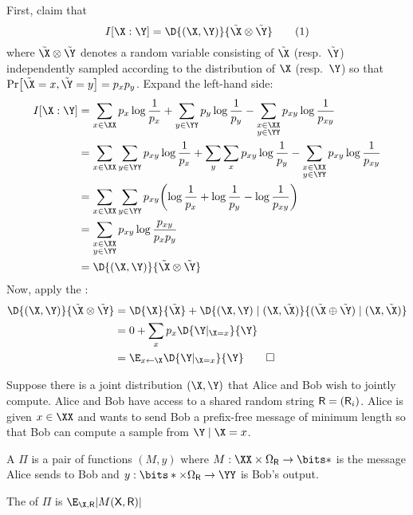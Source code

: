 \documentclass[class=co432,notes,tikz]{agony}
\begin{document}
\begin{prf}
  First, claim that
  \[
    I[\X : \Y] = \D{(\X,\Y)}{\tilde\X \otimes \tilde\Y}
    \nr{eq:claim1}
  \]
  where $\tilde\X \otimes \tilde\Y$ denotes a random variable consisting of
  $\tilde\X$ (resp.\ $\tilde\Y$) independently sampled
  according to the distribution of $\X$ (resp.\ $\Y$)
  so that $\Pr[\tilde\X=x,\tilde\Y=y]=p_x p_y$. Expand the left-hand side:
  \begin{align*}
    I[\X : \Y]
     & = \sum_{x\in\XX} p_x \log\frac1{p_x} + \sum_{y\in\YY} p_y \log\frac1{p_y} - \sum_{\substack{x\in\XX\br y\in\YY}}p_{xy}\log\frac1{p_{xy}}                   \\
     & = \sum_{x\in\XX}\sum_{y\in\YY} p_{xy} \log\frac1{p_x} + \sum_y\sum_x p_{xy} \log\frac1{p_y} - \sum_{\substack{x\in\XX\br y\in\YY}}p_{xy}\log\frac1{p_{xy}} \\
     & = \sum_{x\in\XX}\sum_{y\in\YY} p_{xy} \qty(\log\frac1{p_x} + \log\frac1{p_y} - \log\frac1{p_{xy}})                                                         \\
     & = \sum_{\substack{x\in\XX\br y\in\YY}} p_{xy} \log\frac{p_{xy}}{p_x p_y}                                                                                   \\
     & = \D{(\X,\Y)}{\tilde\X \otimes \tilde\Y}
  \end{align*}
  Now, apply the :
  \begin{align*}
    \D{(\X,\Y)}{\tilde\X \otimes \tilde\Y}
     & = \D{\X}{\tilde\X} + \D{(\X,\Y)\mid(\X,\tilde\X)}{(\tilde\X\oplus\tilde\Y)\mid(\X,\tilde\X)} \\
     & = 0 + \sum_x p_x \D{\Y|_{\X=x}}{\Y}                                                          \\
     & = \E_{x\gets\X}\D{\Y|_{\X=x}}{\Y} \qedhere
  \end{align*}
\end{prf}

\begin{problem}
  Suppose there is a joint distribution $(\X,\Y)$ that Alice and Bob wish to
  jointly compute. Alice and Bob have access to a shared random string $\mathsf R = (\mathsf R_i)$.
  Alice is given $x\in\XX$ and wants to send Bob a prefix-free message of minimum length
  so that Bob can compute a sample from $\Y \mid \X=x$.
\end{problem}

\begin{defn}
  A  $\Pi$ is a pair of functions $(M,y)$ where
  $M : \XX\times\Omega_{\rv R} \to \bits*$ is the message Alice sends to Bob
  and $y : \bits*\times\Omega_{\rv R} \to \YY$ is Bob's output.

  The  of $\Pi$ is $\E_{\X,\rv R}\abs{M(\rv X,\rv R)}$
\end{defn}
\end{document}
